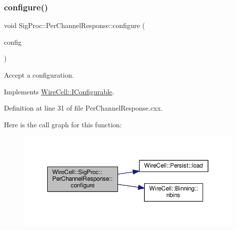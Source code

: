\subsubsection{\texorpdfstring{configure()}{configure()}}
{\footnotesize\ttfamily void Sig\+Proc\+::\+Per\+Channel\+Response\+::configure (\begin{DoxyParamCaption}\item[{const \hyperlink{namespace_wire_cell_a9f705541fc1d46c608b3d32c182333ee}{Wire\+Cell\+::\+Configuration} \&}]{config }\end{DoxyParamCaption})\hspace{0.3cm}{\ttfamily [virtual]}}



Accept a configuration. 



Implements \hyperlink{class_wire_cell_1_1_i_configurable_a57ff687923a724093df3de59c6ff237d}{Wire\+Cell\+::\+I\+Configurable}.



Definition at line 31 of file Per\+Channel\+Response.\+cxx.

Here is the call graph for this function\+:
\nopagebreak
\begin{figure}[H]
\begin{center}
\leavevmode
\includegraphics[width=349pt]{class_wire_cell_1_1_sig_proc_1_1_per_channel_response_aeab6cfaae5ca5e6697a025d957083047_cgraph}
\end{center}
\end{figure}
\mbox{\label{class_wire_cell_1_1_sig_proc_1_1_per_channel_response_a95e138e2ed5ded34511765b237d8e232}} 
